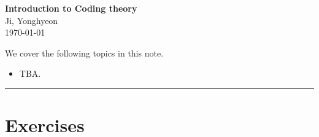 \documentclass[11pt,openany]{article}
\begin{document}
\begin{center}
\huge\textbf{Introduction to Coding theory
}\\
\vspace{0.5em}
\large{Ji, Yonghyeon}\\
\vspace{0.5em}
\normalsize{\today}\\
\end{center}

\noindent 
We cover the following topics in this note.
\begin{itemize}
\item TBA.
\end{itemize}
\hrule\vspace{12pt}
\tableofcontents


\newpage
\newpage
%
%

\newpage
\appendix
\section{Exercises}
\end{document}
